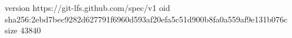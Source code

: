 version https://git-lfs.github.com/spec/v1
oid sha256:2ebd7bec9282d627791f6960d593af20efa5c51d900b8fa0a559af9e131b076c
size 43840
